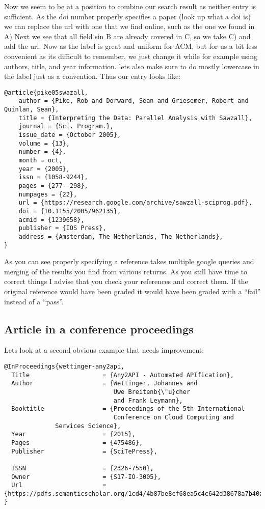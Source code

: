 Now we seem to be at a position to combine our search result as neither
entry is sufficient. As the doi number properly specifies a paper (look
up what a doi is) we can replace the url with one that we find online,
such as the one we found in A) Next we see that all field sin B are
already covered in C, so we take C) and add the url. Now as the label is
great and uniform for ACM, but for us a bit less convenient as its
difficult to remember, we just change it while for example using
authors, title, and year information. lets also make sure to do mostly
lowercase in the label just as a convention. Thus our entry looks like:

\begin{verbatim}
@article{pike05swazall,
    author = {Pike, Rob and Dorward, Sean and Griesemer, Robert and Quinlan, Sean},
    title = {Interpreting the Data: Parallel Analysis with Sawzall},
    journal = {Sci. Program.},
    issue_date = {October 2005},
    volume = {13},
    number = {4},
    month = oct,
    year = {2005},
    issn = {1058-9244},
    pages = {277--298},
    numpages = {22},
    url = {https://research.google.com/archive/sawzall-sciprog.pdf},
    doi = {10.1155/2005/962135},
    acmid = {1239658},
    publisher = {IOS Press},
    address = {Amsterdam, The Netherlands, The Netherlands},
}
\end{verbatim}

As you can see properly specifying a reference takes multiple google
queries and merging of the results you find from various returns. As
you still have time to correct things I advise that you check your
references and correct them. If the original reference would have been
graded it would have been graded with a ``fail'' instead of a ``pass''.

\subsection{Article in a conference
proceedings}\label{article-in-a-conference-proceedings}

Lets look at a second obvious example that needs improvement:

\begin{verbatim}
@InProceedings{wettinger-any2api,
  Title                    = {Any2API - Automated APIfication},
  Author                   = {Wettinger, Johannes and
                              Uwe Breitenb{\"u}cher
                              and Frank Leymann},
  Booktitle                = {Proceedings of the 5th International
                              Conference on Cloud Computing and
              Services Science},
  Year                     = {2015},
  Pages                    = {475­486},
  Publisher                = {SciTePress},

  ISSN                     = {2326-7550},
  Owner                    = {S17-IO-3005},
  Url                      = {https://pdfs.semanticscholar.org/1cd4/4b87be8cf68ea5c4c642d38678a7b40a86de.pdf}
}
\end{verbatim}

